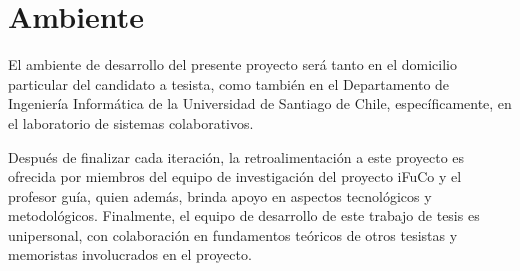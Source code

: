 \section{Ambiente}
\label{sec:ambiente}
El ambiente de desarrollo del presente proyecto será tanto en el domicilio particular del candidato a tesista, como también en el Departamento de Ingeniería Informática de la Universidad de Santiago de Chile, específicamente, en el laboratorio de sistemas colaborativos.

Después de finalizar cada iteración, la retroalimentación a este proyecto es ofrecida por miembros del equipo de investigación del proyecto iFuCo y el profesor guía, quien además, brinda apoyo en aspectos tecnológicos y metodológicos. Finalmente, el equipo de desarrollo de este trabajo de tesis es unipersonal, con colaboración en fundamentos teóricos de otros tesistas y memoristas involucrados en el proyecto. 